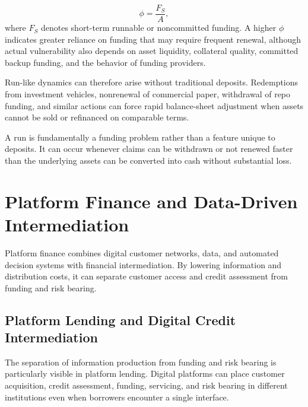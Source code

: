 \begin{equation}
\phi=\frac{F_S}{A},
\label{eq:ch16-short-term-funding-ratio}
\end{equation}
where $F_S$ denotes short-term runnable or noncommitted funding. A higher $\phi$ indicates greater reliance on funding that may require frequent renewal, although actual vulnerability also depends on asset liquidity, collateral quality, committed backup funding, and the behavior of funding providers.

Run-like dynamics can therefore arise without traditional deposits. Redemptions from investment vehicles, nonrenewal of commercial paper, withdrawal of repo funding, and similar actions can force rapid balance-sheet adjustment when assets cannot be sold or refinanced on comparable terms.

\begin{tcolorbox}[
  enhanced,
  breakable,
  colback=white,
  colframe=FinanceBlue,
  boxrule=0.7pt,
  sharp corners,
  borderline west={2.2pt}{0pt}{FinanceBlue},
  title=\textbf{Financial Perspective: A Run Does Not Require a Deposit},
  coltitle=white,
  colbacktitle=FinanceBlue,
  fonttitle=\bfseries,
  before skip=1.2em,
  after skip=1.2em
]

A run is fundamentally a funding problem rather than a feature unique to deposits. It can occur whenever claims can be withdrawn or not renewed faster than the underlying assets can be converted into cash without substantial loss.

\end{tcolorbox}

\section[Platform Finance and Data-Driven Intermediation]{Platform Finance and Data-Driven \\Intermediation}

Platform finance combines digital customer networks, data, and automated decision systems with financial intermediation. By lowering information and distribution costs, it can separate customer access and credit assessment from funding and risk bearing.

\subsection{Platform Lending and Digital Credit Intermediation}

The separation of information production from funding and risk bearing is particularly visible in platform lending. Digital platforms can place customer acquisition, credit assessment, funding, servicing, and risk bearing in different institutions even when borrowers encounter a single interface.

